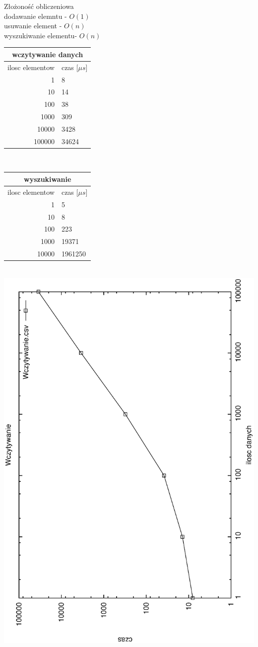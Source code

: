\documentclass[a4paper,11pt]{report}
\begin{document}
Złożoność obliczeniowa \\
dodawanie elemntu - $O(1)$\\  
usuwanie  element - $O(n)$\\
wyszukiwanie elementu- $O(n)$\\
\begin{tabular}{|rl|}
\hline
\multicolumn{2}{|c|}{wczytywanie danych}\\
\hline
ilosc elementow & czas [$\mu s$]\\
\hline
1&8\\
10&14\\
100&38\\
1000&309\\
10000&3428\\
100000&34624\\
\hline
\end{tabular}
\\
\begin{tabular}{|rl|}
\hline
\multicolumn{2}{|c|}{wyszukiwanie}\\
\hline
ilosc elementow & czas [$\mu s$]\\
\hline
1&5\\
10&8\\
100&223\\
1000&19371\\
10000&1961250\\
\hline
\end{tabular}
\\
\includegraphics[angle=270, scale = 0.5]{wykresy/wczytywanie.eps}
\end{document}
